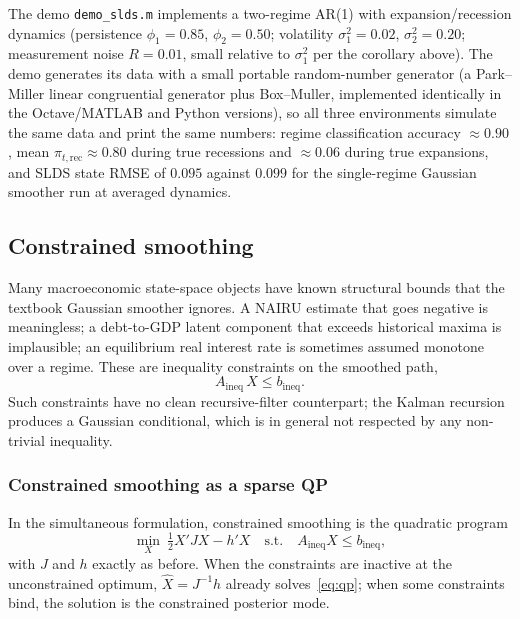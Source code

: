 \documentclass[11pt]{article}
\begin{document}
The demo \texttt{demo\_slds.m} implements a two-regime AR(1) with
expansion/recession dynamics (persistence $\phi_1=0.85$,
$\phi_2=0.50$; volatility $\sigma^2_1=0.02$, $\sigma^2_2=0.20$;
measurement noise $R=0.01$, small relative to $\sigma_1^2$ per the
corollary above).  The demo generates its data with a small portable
random-number generator (a Park--Miller linear congruential generator
plus Box--Muller, implemented identically in the Octave/MATLAB and
Python versions), so all three environments simulate the same data
and print the same numbers: regime classification accuracy
$\approx 0.90$, mean $\pi_{t,\text{rec}}\approx 0.80$ during true
recessions and $\approx 0.06$ during true expansions, and SLDS state
RMSE of $0.095$ against $0.099$ for the single-regime Gaussian
smoother run at averaged dynamics.

\subsection{Constrained smoothing}
\label{sec:constrained}

Many macroeconomic state-space objects have known structural bounds
that the textbook Gaussian smoother ignores.  A NAIRU estimate that
goes negative is meaningless; a debt-to-GDP latent component that
exceeds historical maxima is implausible; an equilibrium real interest
rate is sometimes assumed monotone over a regime.  These are
inequality constraints on the smoothed path,
\begin{equation}
A_{\text{ineq}}\,X\le b_{\text{ineq}}.
\label{eq:ineq}
\end{equation}
Such constraints have no clean recursive-filter counterpart; the
Kalman recursion produces a Gaussian conditional, which is in general
not respected by any non-trivial inequality.

\subsubsection{Constrained smoothing as a sparse QP}

In the simultaneous formulation, constrained smoothing is the
quadratic program
\begin{equation}
\min_X\ \tfrac12 X'JX-h'X
\quad\text{s.t.}\quad A_{\text{ineq}}X\le b_{\text{ineq}},
\label{eq:qp}
\end{equation}
with $J$ and $h$ exactly as before.  When the constraints are
inactive at the unconstrained optimum, $\widehat X=J^{-1}h$ already
solves~\eqref{eq:qp}; when some constraints bind, the solution is
the constrained posterior mode.
\end{document}
